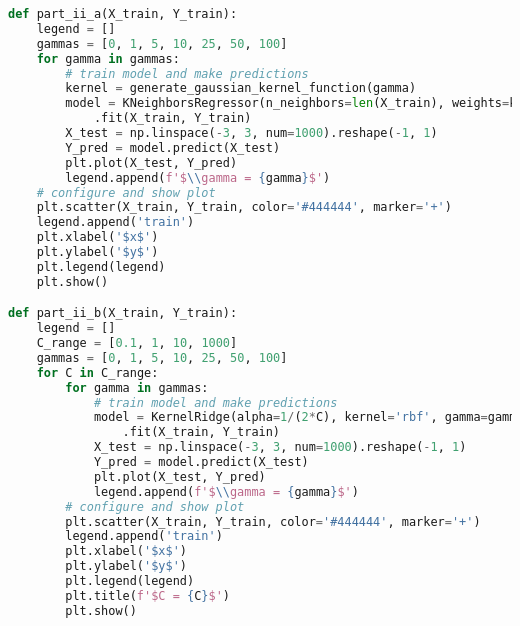 \documentclass[12pt]{article}
\begin{document}
\begin{lstlisting}[language=Python]
def part_ii_a(X_train, Y_train):
    legend = []
    gammas = [0, 1, 5, 10, 25, 50, 100]
    for gamma in gammas:
        # train model and make predictions
        kernel = generate_gaussian_kernel_function(gamma)
        model = KNeighborsRegressor(n_neighbors=len(X_train), weights=kernel)
            .fit(X_train, Y_train)
        X_test = np.linspace(-3, 3, num=1000).reshape(-1, 1)
        Y_pred = model.predict(X_test)
        plt.plot(X_test, Y_pred)
        legend.append(f'$\\gamma = {gamma}$')
    # configure and show plot
    plt.scatter(X_train, Y_train, color='#444444', marker='+')
    legend.append('train')
    plt.xlabel('$x$')
    plt.ylabel('$y$')
    plt.legend(legend)
    plt.show()

def part_ii_b(X_train, Y_train):
    legend = []
    C_range = [0.1, 1, 10, 1000]
    gammas = [0, 1, 5, 10, 25, 50, 100]
    for C in C_range:
        for gamma in gammas:
            # train model and make predictions
            model = KernelRidge(alpha=1/(2*C), kernel='rbf', gamma=gamma)
                .fit(X_train, Y_train)
            X_test = np.linspace(-3, 3, num=1000).reshape(-1, 1)
            Y_pred = model.predict(X_test)
            plt.plot(X_test, Y_pred)
            legend.append(f'$\\gamma = {gamma}$')
        # configure and show plot
        plt.scatter(X_train, Y_train, color='#444444', marker='+')
        legend.append('train')
        plt.xlabel('$x$')
        plt.ylabel('$y$')
        plt.legend(legend)
        plt.title(f'$C = {C}$')
        plt.show()


\end{lstlisting}
\end{document}
